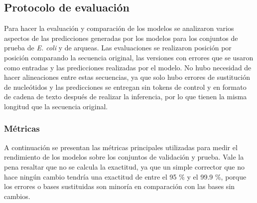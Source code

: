 \documentclass[sigconf,nonacm]{acmart}
\begin{document}
\subsection{Protocolo de evaluación}\label{sec:protocolo}

Para hacer la evaluación y comparación de los modelos se analizaron varios aspectos de las predicciones generadas por los modelos para los conjuntos de prueba de \emph{E. coli} y de arqueas. Las evaluaciones se realizaron posición por posición comparando la secuencia original, las versiones con errores que se usaron como entradas y las predicciones realizadas por el modelo. No hubo necesidad de hacer alineaciones entre estas secuencias, ya que solo hubo errores de sustitución de nucleótidos y las predicciones se entregan sin tokens de control y en formato de cadena de texto después de realizar la inferencia, por lo que tienen la misma longitud que la secuencia original.

\subsubsection{Métricas}\label{sec:metricas}

A continuación se presentan las métricas principales utilizadas para medir el rendimiento de los modelos sobre los conjuntos de validación y prueba. Vale la pena resaltar que no se calcula la exactitud, ya que un simple corrector que no hace ningún cambio tendría una exactitud de entre el 95 \% y el 99.9 \%, porque los errores o bases sustituidas son minoría en comparación con las bases sin cambios.
\end{document}
